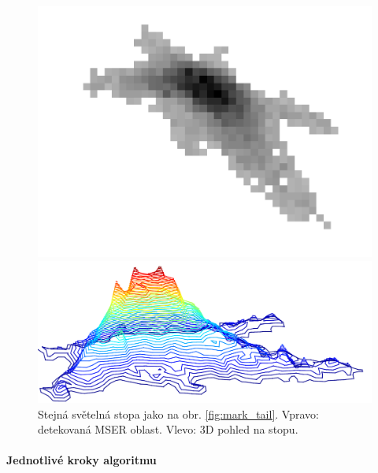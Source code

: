 	\begin{figure}[h!]
	\centering
	\begin{minipage}[c]{0.4\textwidth}
	\includegraphics[width=\textwidth]{figures/tailex01.pdf}
	\end{minipage}
	\begin{minipage}[c]{0.4\textwidth}
	\includegraphics[width=\textwidth]{figures/tailex02.pdf}
	\end{minipage}
	
	\caption[Detektor ocásků - detekce stopy.]{Stejná světelná stopa jako na obr. \ref{fig:mark_tail}. Vpravo: detekovaná MSER oblast. Vlevo: 3D pohled na stopu.}
	\label{fig:mark_tail2}
	\end{figure}


\paragraph{Jednotlivé kroky algoritmu}

